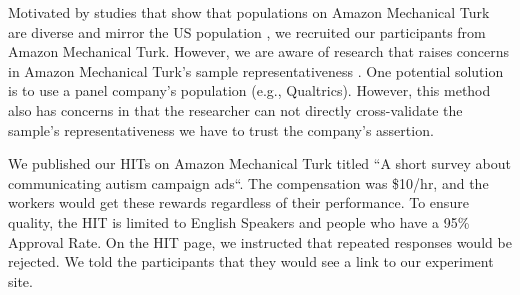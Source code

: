 Motivated by studies that show that populations on Amazon Mechanical Turk are diverse and mirror the US population \cite{buhrmester2011amazon,behrend2011viability,berinsky2012evaluating}, we recruited our participants from Amazon Mechanical Turk. However, we are aware of research that raises concerns in Amazon Mechanical Turk's sample representativeness \cite{landers2015inconvenient,paolacci2010running}. One potential solution is to use a panel company's population (e.g., Qualtrics). However, this method also has concerns in that the researcher can not directly cross-validate the sample's representativeness we have to trust the company's assertion. 

We published our HITs on Amazon Mechanical Turk titled ``A short survey about communicating autism campaign ads``. The compensation was \$10/hr, and the workers would get these rewards regardless of their performance. To ensure quality, the HIT is limited to English Speakers and people who have a 95\% Approval Rate. On the HIT page, we instructed that repeated responses would be rejected. We told the participants that they would see a link to our experiment site. 
